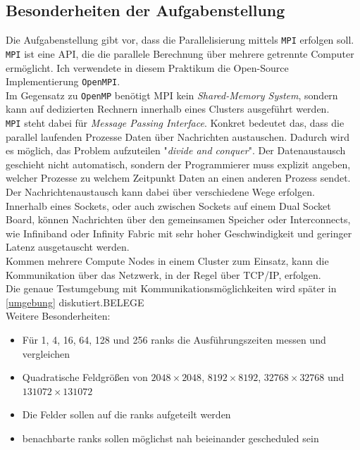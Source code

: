 \documentclass[german,plainarticle,hyperref,utf8]{zihpub}
\begin{document}
	\subsection{Besonderheiten der Aufgabenstellung}
	Die Aufgabenstellung gibt vor, dass die Parallelisierung mittels \texttt{MPI} erfolgen soll. \texttt{MPI} ist eine API, die die parallele Berechnung über mehrere getrennte Computer ermöglicht. Ich verwendete in diesem Praktikum die Open-Source Implementierung \texttt{OpenMPI}.\\
	Im Gegensatz zu \texttt{OpenMP} benötigt MPI kein \textit{Shared-Memory System}, sondern kann auf dedizierten Rechnern innerhalb eines Clusters ausgeführt werden.\\
	
	\texttt{MPI} steht dabei für \textit{Message Passing Interface}. Konkret bedeutet das, dass die parallel laufenden Prozesse Daten über Nachrichten austauschen. Dadurch wird es möglich, das Problem aufzuteilen "\textit{divide and conquer}". Der Datenaustausch geschieht nicht automatisch, sondern der Programmierer muss explizit angeben, welcher Prozesse zu welchem Zeitpunkt Daten an einen anderen Prozess sendet.\\
	
	Der Nachrichtenaustausch kann dabei über verschiedene Wege erfolgen.\\
	Innerhalb eines Sockets, oder auch zwischen Sockets auf einem Dual Socket Board, können Nachrichten über den gemeinsamen Speicher oder Interconnects, wie Infiniband oder Infinity Fabric mit sehr hoher Geschwindigkeit und geringer Latenz ausgetauscht werden.\\
	Kommen mehrere Compute Nodes in einem Cluster zum Einsatz, kann die Kommunikation über das Netzwerk, in der Regel über TCP/IP, erfolgen.\\
	Die genaue Testumgebung mit Kommunikationsmöglichkeiten wird später in \ref{umgebung} diskutiert.BELEGE\\
	
	Weitere Besonderheiten:
	\begin{itemize}
		\item Für 1, 4, 16, 64, 128 und 256 ranks die Ausführungszeiten messen und vergleichen
		\item Quadratische Feldgrößen von $2048\times 2048$, $8192\times 8192$, $32768\times 32768$ und $131072\times 131072$
		\item Die Felder sollen auf die ranks aufgeteilt werden
		\item benachbarte ranks sollen möglichst nah beieinander gescheduled sein
	\end{itemize}
\end{document}
